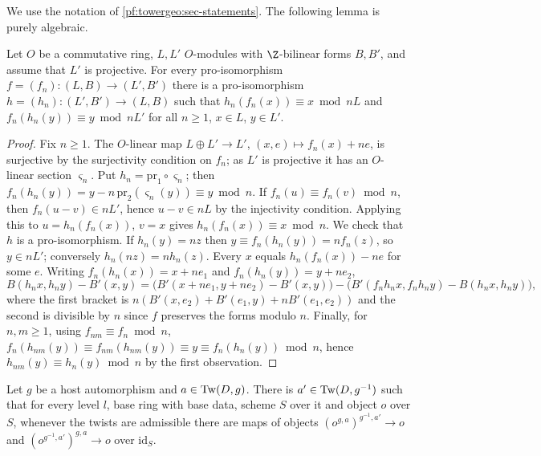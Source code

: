 We use the notation of \cref{pf:towergeo:sec-statements}. The following lemma is purely algebraic.

\begin{lemma}\label{pf:towergeo:proiso-inv}
Let $O$ be a commutative ring, $L,L'$ $O$-modules with $\Z$-bilinear forms $B,B'$, and assume that $L'$ is
projective. For every pro-isomorphism $f=(f_n)\colon(L,B)\to(L',B')$ there is a pro-isomorphism
$h=(h_n)\colon(L',B')\to(L,B)$ such that $h_n(f_n(x))\equiv x\bmod nL$ and $f_n(h_n(y))\equiv y\bmod nL'$
for all $n\ge1$, $x\in L$, $y\in L'$.
\end{lemma}

\begin{proof}
Fix $n\ge1$. The $O$-linear map $L\oplus L'\to L'$, $(x,e)\mapsto f_n(x)+ne$, is surjective by the
surjectivity condition on $f_n$; as $L'$ is projective it has an $O$-linear section $\varsigma_n$. Put
$h_n=\mathrm{pr}_1\circ\varsigma_n$; then $f_n(h_n(y))=y-n\,\mathrm{pr}_2(\varsigma_n(y))\equiv y\bmod n$.
If $f_n(u)\equiv f_n(v)\bmod n$, then $f_n(u-v)\in nL'$, hence $u-v\in nL$ by the injectivity condition.
Applying this to $u=h_n(f_n(x))$, $v=x$ gives $h_n(f_n(x))\equiv x\bmod n$. We check that $h$ is a
pro-isomorphism. If $h_n(y)=nz$ then $y\equiv f_n(h_n(y))=nf_n(z)$, so $y\in nL'$; conversely
$h_n(nz)=nh_n(z)$. Every $x$ equals $h_n(f_n(x))-ne$ for some $e$. Writing $f_n(h_n(x))=x+ne_1$ and
$f_n(h_n(y))=y+ne_2$,
\[
B(h_nx,h_ny)-B'(x,y)=\bigl(B'(x+ne_1,y+ne_2)-B'(x,y)\bigr)-\bigl(B'(f_nh_nx,f_nh_ny)-B(h_nx,h_ny)\bigr),
\]
where the first bracket is $n(B'(x,e_2)+B'(e_1,y)+nB'(e_1,e_2))$ and the second is divisible by $n$ since
$f$ preserves the forms modulo $n$. Finally, for $n,m\ge1$, using $f_{nm}\equiv f_n\bmod n$,
$f_n(h_{nm}(y))\equiv f_{nm}(h_{nm}(y))\equiv y\equiv f_n(h_n(y))\bmod n$, hence
$h_{nm}(y)\equiv h_n(y)\bmod n$ by the first observation.
\end{proof}

\begin{lemma}\label{pf:towergeo:twback}
Let $g$ be a host automorphism and $a\in\mathrm{Tw}(D,g)$. There is $a'\in\mathrm{Tw}(D,g^{-1})$ such that
for every level $l$, base ring with base data, scheme $S$ over it and object $o$ over $S$, whenever the
twists are admissible there are maps of objects $(o^{g,a})^{g^{-1},a'}\to o$ and
$(o^{g^{-1},a'})^{g,a}\to o$ over $\mathrm{id}_S$.
\end{lemma}

